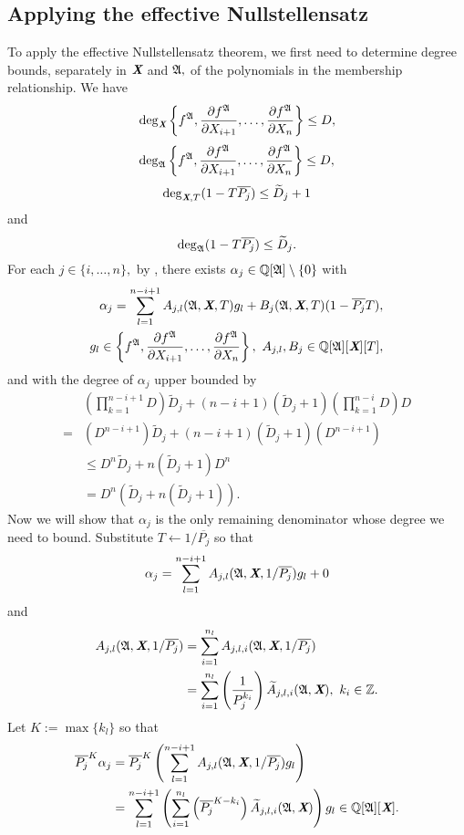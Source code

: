 \documentclass[sigconf]{acmart}
\def\Xb{\textit{\textbf{X}}}
\def\pjb{\overline{P_{j}}}
\def\Q{\mathbb{Q}}
\def\At{\widetilde{A}}
\def\Dt{\widetilde{D}}
\def\A{\frak{A}}
\begin{document}
\subsection{Applying the effective Nullstellensatz}
%
To apply the effective Nullstellensatz theorem, we first need to determine degree bounds, separately in $\Xb$ and $\A,$ of the polynomials in the membership relationship. We have
\[
\deg_{\Xb}\left\{ 
f^\A,\frac{\partial f^\A}{\partial X_{i+1}},\hdots,\frac{\partial f^\A}{\partial X_n}
\right\}\leq D,
\]
\[
\deg_{\A}  
\left\{ 
f^\A,\frac{\partial f^\A}{\partial X_{i+1}},\hdots,\frac{\partial f^\A}{\partial X_n}
\right\} \leq D,
\]
\[
\deg_{\Xb,T}(1-T\pjb) \leq \Dt_j +1 
\]
and
\[
\deg_{\A}(1-T\pjb) \leq \Dt_j.
\]
For each $j \in \{i,\hdots,n\},$ by \cite[Theorem 0.5]{EN}, there exists $\alpha_j \in \mathbb{Q}[\A]\setminus\{0\}$ with 
%
\begin{align*}
\alpha_j = \sum_{l=1}^{n-i+1} A_{j,l}(\A,\textit{\textbf{X}},T)g_l + B_j(\A,\textit{\textbf{X}},T)(1-\pjb T), \\ g_l \in 
\left\{ 
f^\A,\frac{\partial f^\A}{\partial X_{i+1}},\hdots,\frac{\partial f^\A}{\partial X_n}
\right\},~ A_{j,l},B_j \in \mathbb{Q}[\A][\Xb][T],
\end{align*}
%
and with the degree of $\alpha_j$ upper bounded by
%
\begin{align*}
    &\left(\prod_{k=1}^{n-i+1} D\right)\Dt_j 
    + (n-i+1)\left(\Dt_j+1\right)\left(\prod_{k=1}^{n-i}D \right)D\\
    = &\left(D^{n-i+1}\right)\Dt_j+
    (n-i+1)\left(\Dt_j+1\right)\left(D^{n-i+1} \right)\\
    &\leq D^{n}\Dt_j + n\left(\Dt_j+1\right)D^{n}\\
    &=D^n\left(\Dt_j + n\left(\Dt_j+1\right) \right).
\end{align*}
%
Now we will show that $\alpha_j$ is the only remaining denominator whose degree we need to bound. Substitute $T \leftarrow 1/\pjb$ so that 
\[
\alpha_j = \sum_{l=1}^{n-i+1} A_{j,l}(\A,\textit{\textbf{X}},1/\pjb)g_l + 0
\]
and
%
\begin{align*}
A_{j,l}(\A,\textit{\textbf{X}},1/\pjb) 
&= \sum_{i=1}^{n_l} A_{j,l,i}(\A,\Xb,1/\pjb)\\
&= \sum_{i=1}^{n_l} \left(\frac{1}{P_j^{k_i}}\right)\At_{j,l,i}(\A,\textit{\textbf{X}}), ~k_i \in \mathbb{Z}.
\end{align*}
%
Let $K := \max\{k_l\}$ so that 
%
\begin{align*}
    \pjb^K \alpha_j &= \pjb^K\left(\sum_{l=1}^{n-i+1} A_{j,l}(\A,\textit{\textbf{X}},1/\pjb)g_l\right)\\
    &= \sum_{l=1}^{n-i+1}\left( \sum_{i=1}^{n_l}\left(\pjb^{K-k_{i}}\right)\At_{j,l,i}(\A,\Xb) \right)g_l \in \Q[\A][\Xb].
\end{align*}
\end{document}
